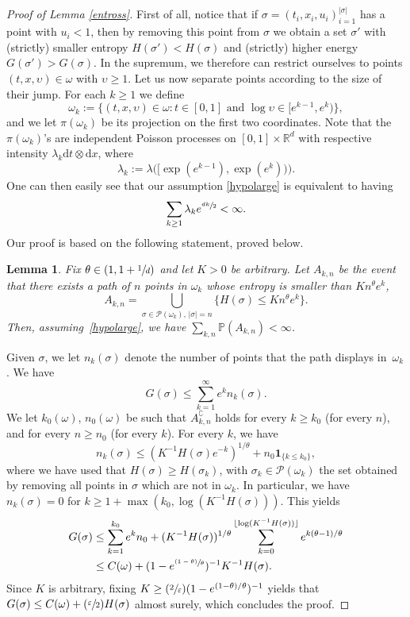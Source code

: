 \documentclass[10pt]{amsart}
\let\mathcal\mathscr
\let\sep:
\newcommand{\Psfrac}[2]{(\sfrac{#1}{#2})}
\newcommand{\psfrac}[2]{\sfrac{(#1)}{#2}}
\newtheorem{lemma}[theorem]{Lemma}
\theoremstyle{definition}
\newcommand{\dd}{\mathrm{d}}
\newcommand{\ind}{\mathbf{1}}
\let\cc\complement
\newcommand{\cP}{{\ensuremath{\mathcal P}} }
\newcommand{\bbP}{{\ensuremath{\mathbb P}} }
\newcommand{\bbR}{{\ensuremath{\mathbb R}} }
\let\gep\varepsilon
\let\gl\lambda
\let\ups\upsilon
\let\go\omega
\begin{document}
\begin{proof}[Proof of Lemma \ref{entross}]
First of all, notice that if $\sigma = (t_i,x_i,u_i)_{i=1}^{|\sigma|}$
has a point with $u_i < 1$,
then by removing this point from $\sigma$
we obtain a set $\sigma'$ with (strictly) smaller entropy $H(\sigma') < H(\sigma)$ and (strictly) higher energy $G(\sigma') > G(\sigma)$.
In the supremum, we therefore can restrict ourselves to points
$(t,x,\ups) \in \go$ with $\ups\geq 1$.
Let us now separate points according to the size of their jump.
For each $k\ge 1$ we define
\[
\go_k := \bigl\{ (t,x, \ups)\in \go \sep t\in[0,1] \text{ and } \log \ups \in [ e^{k-1}, e^{k}) \bigr\},
\]
and we let $\pi(\go_k)$ be its projection on the first two coordinates.
Note that the $\pi(\go_k)$'s are independent Poisson processes on $[0,1]\times \bbR^d$ with respective intensity $\lambda_k \dd t\otimes \dd x$, where
\[
\gl_k:= \gl\bigl(\bigl[\exp(e^{k-1}), \exp(e^k) \bigr) \bigr).
\]
One can then easily see that our assumption \eqref{hypolarge}
is equivalent to
having
\begin{equation}
\label{eq:condition}
\sum_{k\ge 1} \gl_k e^{ \sfrac{dk}{2}}<\infty.
\end{equation}
Our proof is based on the following statement, proved below.
\begin{lemma}\label{bcantelli}
Fix $\theta\in \left(1, 1+\sfrac{1}{d}\right)$ and let $K>0$ be arbitrary.
Let $A_{k,n}$ be the event that there exists a path of $n$ points in $\go_k$ whose entropy is smaller than $K n^{\theta} e^{k}$,
\ie 
\[
A_{k,n} = \bigcup_{ \sigma \in \cP(\go_k),\, |\sigma|=n } \bigl\{ H(\sigma) \leq K n^{\theta} e^k \bigr\}.
\]
Then, assuming~\eqref{hypolarge}, we have $\sum_{k,n} \bbP(A_{k,n})<\infty$.
\end{lemma}
 Given $\sigma$, we let $n_k(\sigma)$ denote the number of points that the path displays in~$\go_k$.
We have
\begin{equation}
G(\sigma)\le \sum_{k=1}^{\infty} e^{k} n_k(\sigma).
\end{equation}
We let $k_0(\go)$, $n_0(\go)$ be such that $A_{k,n}^{\cc}$ holds for every $k\ge k_0$ (for every $n$), and for every $n\ge n_0$ (for every $k$).
For every $k$, we have
\begin{equation}
n_k(\sigma)\le (K^{-1} H(\sigma)e^{-k})^{ 1/\theta} +n_0\ind_{\{k\le k_0\}},
\end{equation}
where we have used that $H(\sigma) \geq H(\sigma_k)$, with $\sigma_k \in \cP(\go_k)$ the set obtained by removing all points in $\sigma$ which are not in $\go_k$.
In particular, we have $n_k(\sigma)=0$ for $k\ge 1+ \max(k_0, \log (K^{-1} H(\sigma)))$.
This yields
\begin{align*}
G(\sigma) &\le \sum_{k=1}^{k_0} e^k n_0
+ (K^{-1} H(\sigma))^{1/\theta} \sum_{k=0}^{\lfloor \log (K^{-1}H(\sigma)) \rfloor}
e^{k(\theta-1) /\theta} \\
& \le C(\go)+ (1-e^{\psfrac{1-\theta}{\theta}})^{-1} K^{-1} H(\sigma).
\end{align*}
Since $K$ is arbitrary, fixing $K \geq \Psfrac{2}{\gep} (1-e^{(1-\theta)/\theta})^{-1}$ yields that
$G(\sigma) \leq C(\go) + \Psfrac{\gep}{2} H(\sigma)$ almost surely, which concludes the proof.
\end{proof}
\end{document}

